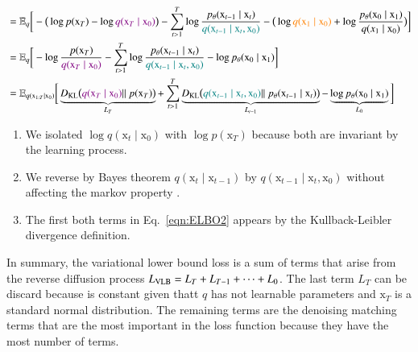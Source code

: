 \begin{equation}
\begin{split}
    & = \mathbb{E}_{q}\bigg[-\big(\log p(\mathrm{x}_{T}) - \log \textcolor{violet}{q(\mathrm{x}_{T}\mid\mathrm{x}_{0})}\big) - \sum_{t>1}^{T} \log \frac{p_{\theta}(\mathrm{x}_{t-1}\mid\mathrm{x}_{t})}{\textcolor{teal}{q(\mathrm{x}_{t-1}\mid\mathrm{x}_{t}, \mathrm{x}_{0})}} - \big( \log\textcolor{orange}{q(\mathrm{x}_{1}\mid\mathrm{x}_{0})}  +\log\frac{p_{\theta}(\mathrm{x}_{0}\mid\mathrm{x}_{1})}{q(x_{1}\mid\mathrm{x}_{0})}\big)\bigg]  \\ 
    & = \mathbb{E}_{q}\bigg[-\log \frac{p(\mathrm{x}_{T})}{\textcolor{violet}{q(\mathrm{x}_{T}\mid\mathrm{x}_{0})}} - \sum_{t>1}^{T} \log \frac{p_{\theta}(\mathrm{x}_{t-1}\mid\mathrm{x}_{t})}{\textcolor{teal}{q(\mathrm{x}_{t-1}\mid\mathrm{x}_{t}, \mathrm{x}_{0})}} -  \log p_{\theta}(\mathrm{x}_{0}\mid\mathrm{x}_{1})\bigg]  \\
    & = \mathbb{E}_{q(\mathrm{x}_{1:T}\mid\mathrm{x}_{0})}\bigg[\underbrace{D_{\text{\scriptsize{KL}}}\big(\textcolor{violet}{q(\mathrm{x}_{T}\mid\mathrm{x}_{0})} ||~p(\mathrm{x}_{T}) \big)}_{L_{T}} + \sum_{t>1}^{T} \underbrace{D_{\text{\scriptsize{KL}}}\big( \textcolor{teal}{q(\mathrm{x}_{t-1}\mid\mathrm{x}_{t}, \mathrm{x}_{0})}||~p_{\theta}(\mathrm{x}_{t-1}\mid\mathrm{x}_{t}) \big)}_{L_{t-1}} -  \underbrace{\log p_{\theta}(\mathrm{x}_{0}\mid\mathrm{x}_{1})}_{L_{0}} \bigg]
    \end{split}
    \end{equation}

    \begin{enumerate}
        \item We isolated $\log q(\mathrm{x}_{t}\mid\mathrm{x}_{0})$ with $\log p(\mathrm{x}_{T})$ because both are invariant by the learning process.
        \item We reverse by Bayes theorem $q(\mathrm{x}_{t}\mid\mathrm{x}_{t-1})$ by $q(\mathrm{x}_{t-1}\mid\mathrm{x}_{t}, \mathrm{x}_{0})$ without affecting the markov property .
        \item The first both terms in Eq.~\ref{eqn:ELBO2} appears by the Kullback-Leibler divergence definition. 
    \end{enumerate}
    

    In summary, the variational lower bound loss is a sum of terms that arise from the reverse diffusion process $L_{\text{\scriptsize{\text{VLB}}}}=L_{T} + L_{T-1} + \dots + L_{0}$. The last term $L_{T}$ can be discard because
    is constant given thatt $q$ has not learnable parameters and $\mathrm{x}_{T}$ is a standard normal distribution. The remaining terms are the denoising matching terms that are the most important in the loss function because they have the most number of terms.\\

